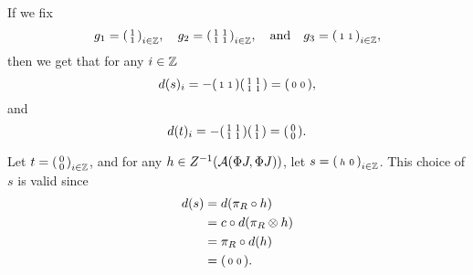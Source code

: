 \begin{example}
    If we fix
    \[
        g_1 = \begin{psmallmatrix} 1 \\ 1 \end{psmallmatrix}_{i \in {\mathbb{Z}}}, \quad g_2 = \begin{psmallmatrix} 1 & 1 \\ 1 & 1 \end{psmallmatrix}_{i \in {\mathbb{Z}}}, \quad \text{and} \quad g_3 = \begin{psmallmatrix} 1 & 1 \end{psmallmatrix}_{i \in {\mathbb{Z}}},
    \]
    then we get that for any \( i \in {\mathbb{Z}} \)
    \[
        d(s)_i = - \begin{psmallmatrix} 1 & 1 \end{psmallmatrix} \begin{psmallmatrix} 1 & 1 \\ 1 & 1 \end{psmallmatrix} = \begin{psmallmatrix} 0 & 0 \end{psmallmatrix},
    \]
    and
    \[
        d(t)_i = - \begin{psmallmatrix} 1 & 1 \\ 1 & 1 \end{psmallmatrix} \begin{psmallmatrix} 1 \\ 1 \end{psmallmatrix} = \begin{psmallmatrix} 0 \\ 0 \end{psmallmatrix}.
    \]

    Let \( t = \begin{psmallmatrix} 0 \\ 0 \end{psmallmatrix}_{i \in {\mathbb{Z}}} \), and for any \( h \in Z^{-1}({\mathcal{A}}(\Phi J, \Phi J)) \), let \( s = \begin{psmallmatrix} h & 0 \end{psmallmatrix}_{i \in {\mathbb{Z}}} \). This choice of \( s \) is valid since
    \begin{align*}
        d(s) &= d( \pi_R \circ h ) \\
        &= c \circ d (\pi_R \otimes h) \\
        &= \pi_R \circ d(h) \\
        &= \begin{psmallmatrix} 0 & 0 \end{psmallmatrix}.
    \end{align*}
    

\end{example}
